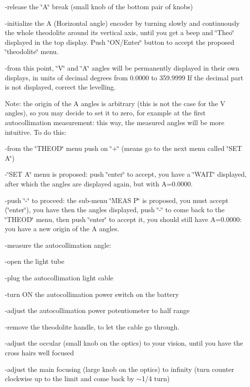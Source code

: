 -release the \char`\"{}A\char`\"{} break (small knob of the bottom pair of knobs) 

-initialize the A (Horizontal angle) encoder by turning slowly and continuously
the whole theodolite around its vertical axis, until you get a beep and \char`\"{}Theo\char`\"{}
displayed in the top display. Push \char`\"{}ON/Enter\char`\"{} button to accept
the proposed \char`\"{}theodolite\char`\"{} menu. 

-from this point, \char`\"{}V\char`\"{} and \char`\"{}A\char`\"{} angles will
be permanently displayed in their own displays, in units of decimal degrees from
0.0000 to 359.9999 If the decimal part is not displayed, correct the levelling. 

Note: the origin of the A angles is arbitrary (this is not the case 
for the V angles), so you may decide to set it to zero, for example at the first
autocollimation measurement: this way, the measured angles will be more intuitive.
To do this: 

-from the \char`\"{}THEOD\char`\"{} menu push on \char`\"{}+\char`\"{} (means
go to the next menu called \char`\"{}SET A\char`\"{}) 

-\char`\"{}SET A\char`\"{} menu is proposed: push \char`\"{}enter\char`\"{}
to accept, you have a \char`\"{}WAIT\char`\"{} displayed, after which the angles
are displayed again, but with A=0.0000. 

-push \char`\"{}-\char`\"{} to proceed: the sub-menu \char`\"{}MEAS P\char`\"{}
is proposed, you must accept (\char`\"{}enter\char`\"{}), you have then the
angles displayed, push \char`\"{}-\char`\"{} to come back to the \char`\"{}THEOD\char`\"{}
menu, then push \char`\"{}enter\char`\"{} to accept it, you should still have
A=0.0000: you have a new origin of the A angles.

-measure the autocollimation angle: 

-open the light tube 

-plug the autocollimation light cable 

-turn ON the autocollimation power switch on the battery 

-adjust the autocollimation power potentiometer to half range 

-remove the theodolite handle, to let the cable go through. 

-adjust the occular (small knob on the optics) to your vision, until you have
the cross hairs well focused 

-adjust the main focusing (large knob on the optics) to infinity (turn counter
clockwise up to the limit and come back by \( \sim  \)1/4 turn) 

